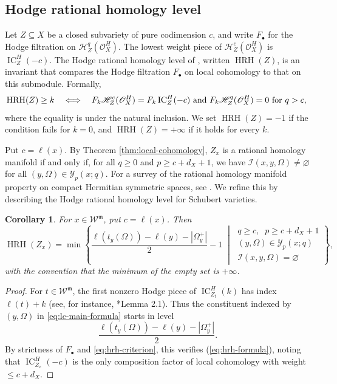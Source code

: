 \documentclass[12pt]{amsart}
\newtheorem{cor}[theorem]{Corollary}
\theoremstyle{definition}
\numberwithin{equation}{section}
\newcommand{\m}{\mathfrak m}
\newcommand{\W}{\mathscr W}
\begin{document}
\subsection{Hodge rational homology level}

Let $Z\subseteq X$ be a closed subvariety of pure codimension $c$,
and write $F_\bullet$ for the Hodge filtration on $\mathscr H_Z^q(\mathscr O_X^H)$. The lowest weight piece of
$\mathscr H_Z^c(\mathscr O_X^H)$ is
$\operatorname{IC}_Z^H(-c)$. The Hodge rational homology level
of \cites{DORhrh, ParkPopa}, written $\operatorname{HRH}(Z)$, is an invariant
that compares the Hodge filtration $F_{\bullet}$ on local cohomology to that
on this submodule. Formally,
\begin{equation}\label{eq:hrh-criterion}
 \operatorname{HRH}(Z)\geq k\quad\Longleftrightarrow\quad
 F_k\mathscr H_Z^c(\mathscr O_X^H)
   =F_k\operatorname{IC}_Z^H(-c)\textnormal{ and }
 F_k\mathscr H_Z^q(\mathscr O_X^H)=0\textnormal{ for $q>c$, }
\end{equation}
where the equality is under the natural inclusion.
We set $\operatorname{HRH}(Z)=-1$ if the condition fails for
$k=0$, and $\operatorname{HRH}(Z)=+\infty$ if it holds for
every $k$. 

Put $c=\ell(x)$. By Theorem \ref{thm:local-cohomology}, $Z_x$ is a
rational homology manifold if and only if, for all $q\geq 0$ and $p\geq c+d_X+1$, we have $\mathscr{I}(x,y,\Omega)\neq \varnothing$ for all $(y,\Omega)\in \mathscr{Y}_p(x;q)$. For a survey of the rational homology manifold property on compact Hermitian symmetric spaces, see \cite[Sections 4.3, 5.3]{EHP}. We refine this by describing the Hodge rational homology level for Schubert varieties.

\begin{cor}\label{cor:hrh}
For $x\in\W^{\m}$, put $c=\ell(x)$. Then
\begin{equation}\label{eq:hrh-formula}
 \operatorname{HRH}(Z_x)
 =\min\left\{
       \frac{\ell(t_y(\Omega))-\ell(y)-|\Omega_y^+|}{2}-1 \;\middle|\; \substack{q\geq c,\;\;p\geq c+d_X+1\\ (y,\Omega)\in  \mathscr{Y}_p(x;q)\\
                         \mathscr I(x,y,\Omega)=\varnothing} \right\},
\end{equation}
with the convention that the minimum of the empty set is $+\infty$.
\end{cor}
\begin{proof}
For $t\in \W^{\m}$, the first nonzero Hodge piece of
$\operatorname{IC}_{Z_t}^H(k)$ has index $\ell(t)+k$ (see, for instance, \cite{PRdet}*{Lemma 2.1}). Thus the constituent
indexed by $(y,\Omega)$ in \eqref{eq:lc-main-formula} starts in level
\begin{equation}\label{eq:hrh-first-level}
\frac{\ell(t_y(\Omega))-\ell(y)-|\Omega_y^+|}{2}.
\end{equation}
By strictness of $F_\bullet$ and \eqref{eq:hrh-criterion}, this verifies (\ref{eq:hrh-formula}), noting that $\operatorname{IC}^H_{Z_x}(-c)$ is the only composition factor of local cohomology with weight $\leq c+d_X$.
\end{proof}
\end{document}
